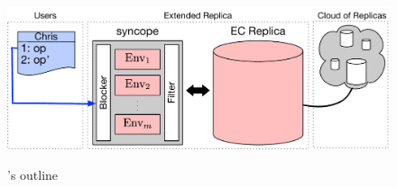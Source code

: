 \begin{figure}[t]
	\includegraphics[scale=0.38]{Figures/syncope_outline.pdf}
	\label{fig:syncope_outline}
	\caption{\tool's outline}
\label{fig:comment_app}
\end{figure}


